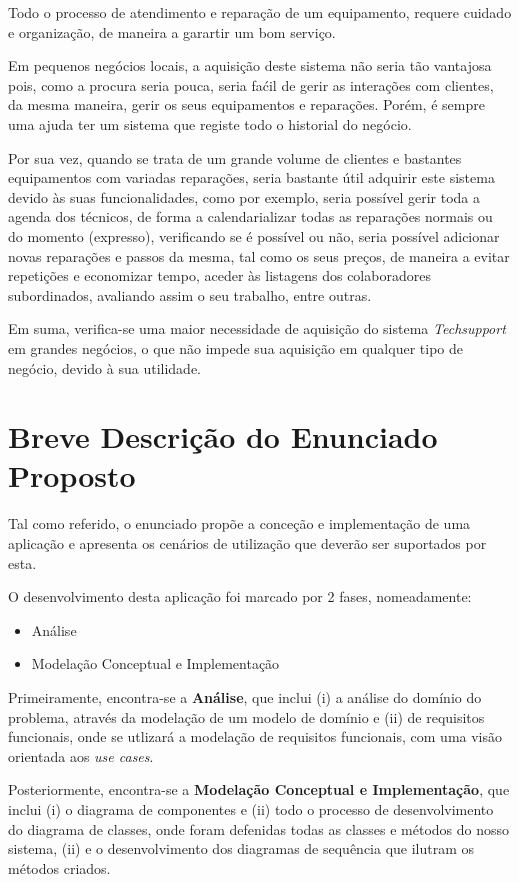 \documentclass[a4paper,12pt]{scrreprt}
\begin{document}
Todo o processo de atendimento e reparação de um equipamento, requere cuidado e organização, de maneira a garartir um bom serviço.

Em pequenos negócios locais, a aquisição deste sistema não seria tão vantajosa pois, como a procura seria pouca, seria faćil
de gerir as interações com clientes, da mesma maneira, gerir os seus equipamentos e reparações. Porém, é sempre uma ajuda ter um sistema que
registe todo o historial do negócio.

Por sua vez, quando se trata de um grande volume de clientes e bastantes equipamentos com variadas reparações, seria bastante útil adquirir este sistema 
devido às suas funcionalidades, como por exemplo, seria possível gerir toda a agenda dos técnicos, de forma a calendarializar todas as reparações normais ou do momento (expresso), 
verificando se é possível ou não, seria possível adicionar novas reparações e passos da mesma, tal como os seus preços, de maneira a evitar repetições e economizar tempo, aceder 
às listagens dos colaboradores subordinados, avaliando assim o seu trabalho, entre outras.

Em suma, verifica-se uma maior necessidade de aquisição do sistema \textit{Techsupport} em grandes negócios, o que não impede sua aquisição em qualquer tipo de negócio, 
devido à sua utilidade.

\section{Breve Descrição do Enunciado Proposto}

Tal como referido, o enunciado propõe a conceção e implementação de uma aplicação e apresenta os cenários de utilização que deverão ser
suportados por esta.

O desenvolvimento desta aplicação foi marcado por 2 fases, nomeadamente:
\begin{itemize}
    \item Análise
    \item Modelação Conceptual e Implementação
\end{itemize}

Primeiramente, encontra-se a \textbf{Análise}, que inclui
(i) a análise do domínio do problema, através da modelação de um modelo de domínio e 
(ii) de requisitos funcionais, onde se utlizará a modelação de requisitos funcionais, com uma visão orientada aos \textit{use cases}.

Posteriormente, encontra-se a \textbf{Modelação Conceptual e Implementação}, que inclui
(i) o diagrama de componentes e 
(ii) todo o processo de desenvolvimento do diagrama de classes, onde foram defenidas todas as classes e métodos do nosso sistema,
(ii) e o desenvolvimento dos diagramas de sequência que ilutram os métodos criados.
\end{document}
